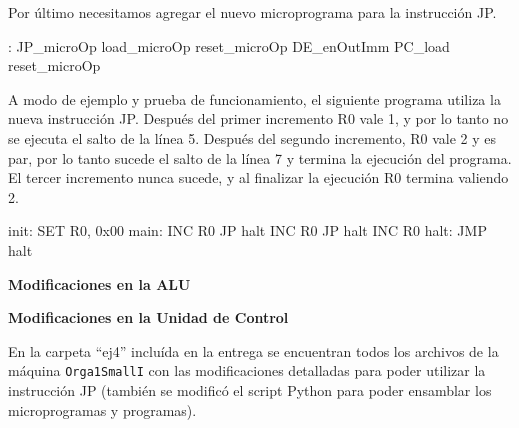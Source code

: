 Por último necesitamos agregar el nuevo microprograma para la instrucción JP.

\begin{algorithm}[H]
\ttfamily
\begin{algorithmic}[1]
    : 
    \State \;\; JP\_microOp load\_microOp 
    \State \;\; reset\_microOp 
    \State \;\; DE\_enOutImm PC\_load 
    \State \;\; reset\_microOp
\end{algorithmic}
\end{algorithm}

A modo de ejemplo y prueba de funcionamiento, el siguiente programa utiliza la nueva instrucción JP. Después del primer incremento R0 vale 1, y por lo tanto no se ejecuta el salto de la línea 5. Después del segundo incremento, R0 vale 2 y es par, por lo tanto sucede el salto de la línea 7 y termina la ejecución del programa. El tercer incremento nunca sucede, y al finalizar la ejecución R0 termina valiendo 2.

\begin{algorithm}[H]
\ttfamily
\begin{algorithmic}[1]
    \State init:
    \State SET R0, 0x00
    \State main:
    \State INC R0
    \State JP halt 
    \State INC R0
    \State JP halt 
    \State INC R0
    \State halt:
    \State JMP halt
\end{algorithmic}
\end{algorithm}

\textbf{Modificaciones en la ALU}

\begin{figure}[H]
    \centering
    
\end{figure}

\textbf{Modificaciones en la Unidad de Control}

\begin{figure}[H]
    \centering
    
\end{figure}

En la carpeta ``ej4'' incluída en la entrega se encuentran todos los archivos de la máquina \lstinline{Orga1SmallI} con las modificaciones detalladas para poder utilizar la instrucción JP (también se modificó el script Python para poder ensamblar los microprogramas y programas).
